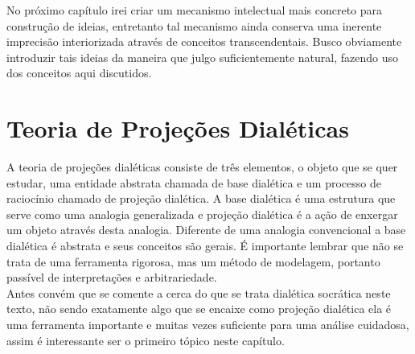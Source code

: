 \documentclass[10pt,a4paper]{report}
\begin{document}
No próximo capítulo irei criar um mecanismo intelectual mais concreto para construção de ideias, entretanto tal mecanismo ainda conserva uma inerente imprecisão interiorizada através de conceitos transcendentais. Busco obviamente introduzir tais ideias da maneira que julgo suficientemente natural, fazendo uso dos conceitos aqui discutidos.

 


\chapter{Teoria de Projeções Dialéticas}

\hspace{\baselineskip}

A teoria de projeções dialéticas consiste de três elementos, o objeto que se quer estudar, uma entidade abstrata chamada de base dialética e um processo de raciocínio chamado de projeção dialética. A base dialética é uma estrutura que serve como uma analogia generalizada e projeção dialética é a ação de enxergar um objeto através desta analogia. Diferente de uma analogia convencional a base dialética é abstrata e seus conceitos são gerais. É importante lembrar que não se trata de uma ferramenta rigorosa, mas um método de modelagem, portanto passível de interpretações e arbitrariedade.\\

Antes convém que se comente a cerca do que se trata dialética socrática neste texto, não sendo exatamente algo que se encaixe como projeção dialética ela é uma ferramenta importante e muitas vezes suficiente para uma análise cuidadosa, assim é interessante ser o primeiro tópico neste capítulo.


\end{document}
